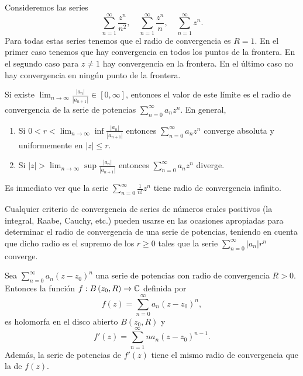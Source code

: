 \begin{eg}
Consideremos las series
\[\sum^{\infty}_{n = 1}\frac{z^{n}}{n^{2}}, \quad \sum^{\infty}_{n = 1}\frac{z^{n}}{n}, \quad \sum^{\infty}_{n = 1}z^{n} .\]
Para todas estas series tenemos que el radio de convergencia es $\displaystyle R = 1 $. En el primer caso tenemos que hay convergencia en todos los puntos de la frontera. En el segundo caso para $\displaystyle z \neq 1 $ hay convergencia en la frontera. En el último caso no hay convergencia en ningún punto de la frontera.
\end{eg}
\begin{theorem}
	Si existe $\displaystyle \lim_{n \to \infty}\frac{ \left|a_{n}\right|}{ \left|a_{n+1}\right|}\in [0,\infty] $, entonces el valor de este límite es el radio de convergencia de la serie de potencias $\displaystyle \sum^{\infty}_{n = 0}a_{n}z^{n} $. En general,
	\begin{enumerate}
	\item Si $\displaystyle 0 < r < \lim_{n \to \infty}\inf \frac{ \left|a_{n}\right|}{ \left|a_{n+1}\right|} $ entonces $\displaystyle \sum^{\infty}_{n = 0}a_{n}z^{n} $ converge absoluta y uniformemente en $\displaystyle \left|z\right|\leq r $.
	\item Si $\displaystyle \left|z\right|> \lim_{n \to \infty}\sup \frac{ \left|a_{n}\right|}{ \left|a_{n+1}\right|} $ entonces $\displaystyle \sum^{\infty}_{n = 0}a_{n}z^{n} $ diverge.
	\end{enumerate}
\end{theorem}
\begin{eg}
Es inmediato ver que la serie $\displaystyle \sum^{\infty}_{n = 0}\frac{1}{n!}z^{n} $ tiene radio de convergencia infinito. 
\end{eg}
\begin{observation}
Cualquier criterio de convergencia de series de números erales positivos (la integral, Raabe, Cauchy, etc.) pueden usarse en las ocasiones apropiadas para determinar el radio de convergencia de una serie de potencias, teniendo en cuenta que dicho radio es el supremo de los $\displaystyle r \geq 0 $ tales que la serie $\displaystyle \sum^{\infty}_{n = 0} \left|a_{n}\right| r^{n} $ converge.
\end{observation}
\begin{theorem}
Sea $\displaystyle \sum^{\infty}_{n = 0}a_{n} \left(z-z_{0}\right)^{n} $ una serie de potencias con radio de convergencia $\displaystyle R>0 $. Entonces la función $\displaystyle f : B\left(z_{0}, R\right)\to \mathbb{C} $ definida por
\[f\left(z\right)=\sum^{\infty}_{n = 0}a_{n}\left(z-z_{0}\right)^{n} ,\]
es holomorfa en el disco abierto $\displaystyle B\left(z_{0}, R\right) $ y 
\[f'\left(z\right)=\sum^{\infty}_{n = 1}na_{n}\left(z-z_{0}\right)^{n-1} .\]
Además, la serie de potencias de $\displaystyle f'\left(z\right) $ tiene el mismo radio de convergencia que la de $\displaystyle f\left(z\right) $. 
\end{theorem}
